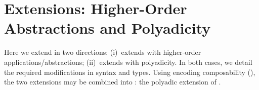 \documentclass[runningheads]{llncs}
\begin{document}
{{





\section{Extensions: Higher-Order Abstractions and Polyadicity}
\label{sec:extension}
%

Here we extend \HOp in two directions: %
(i)~\HOpp  extends   \HOp with higher-order applications/abstractions;
(ii)~\PHOp   extends  \HOp
with polyadicity.
In both cases, we detail the
required modifications in syntax and types.
Using encoding composability (), 
the two extensions may be combined into \PHOpp: the polyadic extension of \HOpp.


}}
\end{document}
